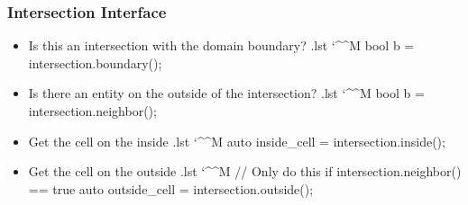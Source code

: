 \documentclass[ignorenonframetext,11pt]{beamer}
\makeatletter
\theoremstyle{definition}
\newenvironment{codeblock}{%
  \begin{tcolorbox}[size=small,oversize,boxrule=0pt,colframe=white]}{%
  \end{tcolorbox}}
\newenvironment{cppcode}{%
  \begingroup
  \@bsphack
  \immediate\openout\lstvrb@out\jobname.lst
  \let\do\@makeother\dospecials\catcode`\^^M\active
  \def\verbatim@processline{%
    \immediate\write\lstvrb@out{\the\verbatim@line}}%
  \verbatim@start}{%
  \immediate\closeout\lstvrb@out
  \@esphack
  \endgroup
  \begin{codeblock}
    
  \end{codeblock}}
\makeatother
\begin{document}



\begin{frame}[fragile]
  \frametitle{Intersection Interface}
  \begin{itemize}
  \item Is this an intersection with the domain boundary?
    \begin{cppcode}
bool b = intersection.boundary();
    \end{cppcode}
  \item Is there an entity on the outside of the intersection?
    \begin{cppcode}
bool b = intersection.neighbor();
    \end{cppcode}
  \item Get the cell on the inside
    \begin{cppcode}
auto inside_cell = intersection.inside();
    \end{cppcode}
  \item Get the cell on the outside
    \begin{cppcode}
// Only do this if intersection.neighbor() == true
auto outside_cell = intersection.outside();
    \end{cppcode}
  \end{itemize}

\end{frame}
\end{document}
